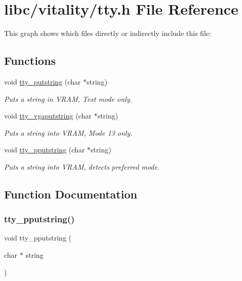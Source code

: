 \hypertarget{a00116}{}\section{libc/vitality/tty.h File Reference}
\label{a00116}
This graph shows which files directly or indirectly include this file\+:
\subsection*{Functions}
\begin{DoxyCompactItemize}
\item 
void \hyperlink{a00116_a2ebb962f457a2677d70285d1c0f9be12_a2ebb962f457a2677d70285d1c0f9be12}{tty\+\_\+putstring} (char $\ast$string)
\begin{DoxyCompactList}\small\item\em Puts a string in V\+R\+AM, Text mode only. \end{DoxyCompactList}\item 
void \hyperlink{a00116_a13ff2c06d56753c5666ca56cb2d81100_a13ff2c06d56753c5666ca56cb2d81100}{tty\+\_\+vgaputstring} (char $\ast$string)
\begin{DoxyCompactList}\small\item\em Puts a string into V\+R\+AM, Mode 13 only. \end{DoxyCompactList}\item 
void \hyperlink{a00116_ade960b1320324706aac6c00cc6b1b2fe_ade960b1320324706aac6c00cc6b1b2fe}{tty\+\_\+pputstring} (char $\ast$string)
\begin{DoxyCompactList}\small\item\em Puts a string into V\+R\+AM, detects preferred mode. \end{DoxyCompactList}\end{DoxyCompactItemize}


\subsection{Function Documentation}
\mbox{\label{a00116_ade960b1320324706aac6c00cc6b1b2fe_ade960b1320324706aac6c00cc6b1b2fe}} 
\subsubsection{\texorpdfstring{tty\+\_\+pputstring()}{tty\_pputstring()}}
{\footnotesize\ttfamily void tty\+\_\+pputstring (\begin{DoxyParamCaption}\item[{char $\ast$}]{string }\end{DoxyParamCaption})}



